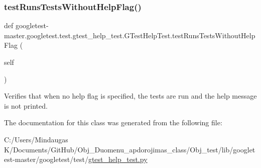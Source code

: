 \subsubsection{\texorpdfstring{testRunsTestsWithoutHelpFlag()}{testRunsTestsWithoutHelpFlag()}}
{\footnotesize\ttfamily def googletest-\/master.\+googletest.\+test.\+gtest\+\_\+help\+\_\+test.\+G\+Test\+Help\+Test.\+test\+Runs\+Tests\+Without\+Help\+Flag (\begin{DoxyParamCaption}\item[{}]{self }\end{DoxyParamCaption})}

\begin{DoxyVerb}Verifies that when no help flag is specified, the tests are run
and the help message is not printed.\end{DoxyVerb}
 

The documentation for this class was generated from the following file\+:\begin{DoxyCompactItemize}
\item 
C\+:/\+Users/\+Mindaugas K/\+Documents/\+Git\+Hub/\+Obj\+\_\+\+Duomenu\+\_\+apdorojimas\+\_\+class/\+Obj\+\_\+test/lib/googletest-\/master/googletest/test/\mbox{\hyperlink{_obj__test_2lib_2googletest-master_2googletest_2test_2gtest__help__test_8py}{gtest\+\_\+help\+\_\+test.\+py}}\end{DoxyCompactItemize}
